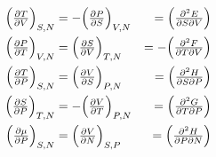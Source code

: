 \begin{cheatformula}\\
\begin{align*}
    \Bigl(\tfrac{\partial T}{\partial V}\Bigr)_{S,N} &= - \Bigl(\tfrac{\partial P}{\partial S}\Bigr)_{V,N} &= \Bigl(\tfrac{\partial^2 E}{\partial S \partial V}\Bigr) \\ 
    \Bigl(\tfrac{\partial P}{\partial T}\Bigr)_{V,N} &= \Bigl(\tfrac{\partial S}{\partial V}\Bigr)_{T,N} &= - \Bigl(\tfrac{\partial^2 F}{\partial T \partial V}\Bigr) \\ 
    \Bigl(\tfrac{\partial T}{\partial P}\Bigr)_{S,N} &= \Bigl(\tfrac{\partial V}{\partial S}\Bigr)_{P,N} &=  \Bigl(\tfrac{\partial^2 H}{\partial S \partial P}\Bigr)\\
    \Bigl(\tfrac{\partial S}{\partial P}\Bigr)_{T,N} &= - \Bigl(\tfrac{\partial V}{\partial T}\Bigr)_{P,N} &= \Bigl(\tfrac{\partial^2 G}{\partial T \partial P}\Bigr)\\
    \Bigl(\tfrac{\partial \mu}{\partial P}\Bigr)_{S,N} &=  \Bigl(\tfrac{\partial V}{\partial N}\Bigr)_{S,P} &= \Bigl(\tfrac{\partial^2 H}{\partial P \partial N}\Bigr)
\end{align*}   
\end{cheatformula}
